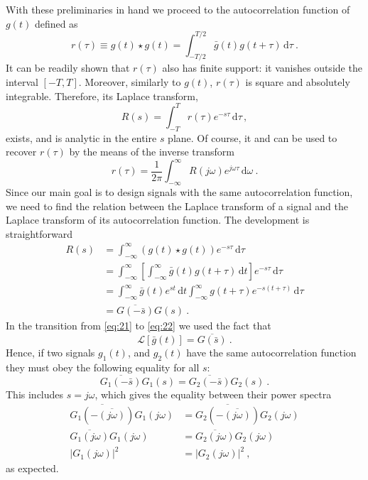 With these preliminaries in hand we proceed to the autocorrelation
function of $g(t)$ defined as
\begin{equation}
  \label{eq:14}
  r(\tau) \equiv g(t)\star g(t) =
  \int^{T/2}_{-T/2}\bar{g}(t)g(t+\tau)\,\mathrm{d}\tau\ .
\end{equation}
It can be readily shown that $r(\tau)$ also has finite support: it
vanishes outside the interval $[-T, T]$. Moreover, similarly to
$g(t)$, $r(\tau)$ is square and absolutely integrable. Therefore, its
Laplace transform,
\begin{equation}
  \label{eq:15}
  R(s) = \int^{T}_{-T}r(\tau) e^{-s\tau}\, \mathrm{d}\tau \,, 
\end{equation}
exists, and  is analytic in the entire $s$ plane. Of course, it and can be used to
recover $r(\tau)$ by the means of the inverse
transform
\begin{equation}
  \label{eq:16}
  r(\tau) =
  \frac{1}{2\pi}\int^{\infty}_{-\infty}R(j\omega)e^{j\omega\tau}\,
  \mathrm{d}\omega\ .
\end{equation}
Since our main goal is to design signals with the same autocorrelation
function, we need to find the relation between the Laplace transform of
a signal and the Laplace transform of its autocorrelation
function. The development is straightforward
\begin{align}
  \label{eq:19}
  R(s)
  & = \int^{\infty}_{-\infty} (g(t)\star g(t)) e^{-s\tau}\,\mathrm{d}\tau \\
  & = \int^{\infty}_{-\infty}
  \left[
    \int^{\infty}_{-\infty} \bar{g}(t) g(t+\tau)\, \mathrm{d}t
  \right]  e^{-s\tau} \,\mathrm{d}\tau\\
  & =  \int^{\infty}_{-\infty} \bar{g}(t) e^{st}\, \mathrm{d} t
  \int^{\infty}_{-\infty}g(t+\tau) e^{-s(t+\tau)}\, \mathrm{d} \tau\label{eq:21}\\
  & =  \overline{G(-\bar{s})}G(s)\label{eq:22} \ .
\end{align}
In the transition from \eqref{eq:21} to \eqref{eq:22} we used the fact
that
\begin{equation}
  \label{eq:23}
  \mathcal{L}[\bar{g}(t)] = \overline{G(\bar{s})}\ .
\end{equation}
Hence, if two signals $g_{1}(t)$, and $g_{2}(t)$ have the same
autocorrelation function they must obey the following equality for all $s$:
\begin{equation}
  \label{eq:18}
  \overline{G_{1}(-\bar{s})}G_{1}(s) = \overline{G_{2}(-\bar{s})}G_{2}(s) \ .
\end{equation}
This includes  $s = j\omega$, which gives the equality between their
power spectra
\begin{equation}
  \label{eq:24}
  \begin{split}
    \overline{G_{1}(-\overline{(j\omega)})}G_{1}(j\omega) & =
    \overline{G_{2}(-\overline{(j\omega)})}G_{2}(j\omega) \\
    \overline{G_{1}(j\omega)}G_{1}(j\omega) & =
    \overline{G_{2}(j\omega)}G_{2}(j\omega)\\
    |G_{1}(j\omega)|^{2} & =  |G_{2}(j\omega)|^{2} \ ,
  \end{split}
\end{equation}
as expected.

